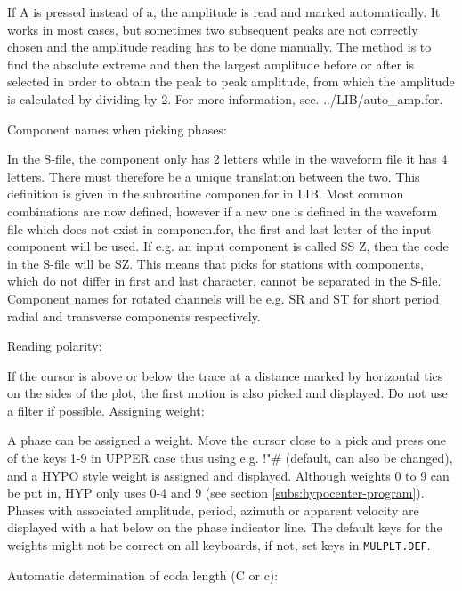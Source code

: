 If A is pressed instead of a, the amplitude is read and marked automatically. It works in most cases, but sometimes two subsequent peaks are not correctly chosen and the amplitude reading has to be done manually. The method is to find the absolute extreme and then the largest amplitude before or after is selected in order to obtain the peak to peak amplitude, from which the amplitude is calculated by dividing by 2. For more information, see.  ../LIB/auto\_amp.for. 

Component names when picking phases: 

In the S-file, the component only has 2 letters while in the waveform file it has 4 letters. There must therefore be a unique translation between the two. This definition is given in the subroutine componen.for in LIB. Most common combinations are now defined, however if a new one is defined in the waveform file which does not exist in componen.for, the first and last letter of the input component will be used. If e.g. an input component is called SS Z, then the code in the S-file will be SZ. This means that picks for stations with components, which do not differ in first and last character, cannot be separated in the S-file. Component names for rotated channels will be e.g. SR and ST for short period radial and transverse components respectively. 

Reading polarity: 

If the cursor is above or below the trace at a distance marked by horizontal tics on the sides of the plot, the first motion is also picked and displayed. Do not use a filter if possible.  
Assigning weight: 

A phase can be assigned a weight. Move the cursor close to a pick and press one of the keys 1-9 in UPPER case thus using e.g. !"\# (default, can also be changed), and a HYPO style weight is assigned and displayed. Although weights 0 to 9 can be put in, HYP only uses 0-4 and 9 (see section \ref{subs:hypocenter-program}). Phases with associated amplitude, period, azimuth or apparent velocity are displayed with a hat below on the phase indicator line. The default keys for the weights might not be correct on all keyboards, if not, set keys in \texttt{MULPLT.DEF}.  

Automatic determination of coda length (C or c): 

